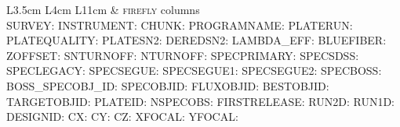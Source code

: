 \documentclass[onecolumn]{aa}
\begin{document}
\begin{table}
\caption{\label{table:data:model} Data model of the summary files. \$\{IMF\} takes values in 'Chabrier', 'Kroupa', 'Salpeter'; \$\{LIBRARY\} takes values in 'MILES', 'STELIB', 'ELODIE' and \$\{i\} takes values in 0 to 9.}
\begin{center}
\begin{tabular}{ L{3.5cm} L{4cm} L{11cm} }
\hline \hline
{} & \textsc{firefly} columns \\
\hline
SURVEY:  \newline 
INSTRUMENT:  \newline 
CHUNK:  \newline 
PROGRAMNAME:  \newline 
PLATERUN:  \newline 
PLATEQUALITY:  \newline 
PLATESN2:  \newline 
DEREDSN2:  \newline 
LAMBDA\_EFF:  \newline 
BLUEFIBER:  \newline 
ZOFFSET:  \newline 
SNTURNOFF:  \newline 
NTURNOFF:  \newline 
SPECPRIMARY:  \newline 
SPECSDSS:  \newline 
SPECLEGACY:  \newline 
SPECSEGUE:  \newline 
SPECSEGUE1:  \newline 
SPECSEGUE2:  \newline 
SPECBOSS:  \newline 
BOSS\_SPECOBJ\_ID:  \newline 
SPECOBJID:  \newline 
FLUXOBJID:  \newline 
BESTOBJID:  \newline 
TARGETOBJID:  \newline 
PLATEID:  \newline 
NSPECOBS:  \newline 
FIRSTRELEASE:  \newline 
RUN2D:  \newline 
RUN1D:  \newline 
DESIGNID:  \newline 
CX:  
CY:  
CZ:  \newline 
XFOCAL:  \newline 
YFOCAL:  \newline 

\end{tabular}
\end{center}
\end{table}
\end{document}
